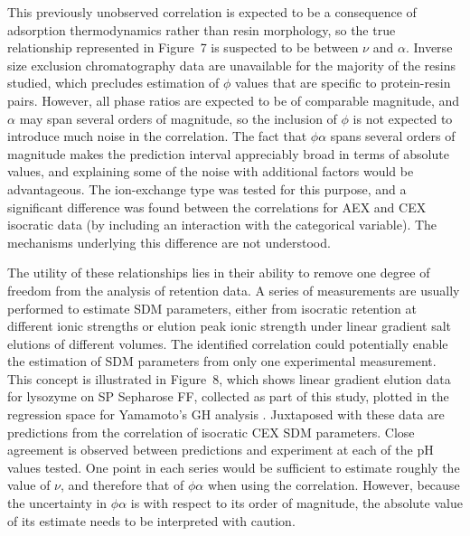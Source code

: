 \documentclass[preprint,review,12pt]{elsarticle}
\begin{document}
        This previously unobserved correlation is expected to be a consequence of adsorption thermodynamics rather than resin morphology, so the true relationship represented in Figure~7 is suspected to be between $\nu$ and $\alpha$. Inverse size exclusion chromatography data are unavailable for the majority of the resins studied, which precludes estimation of $\phi$ values that are specific to protein-resin pairs. However, all phase ratios are expected to be of comparable magnitude, and $\alpha$ may span several orders of magnitude, so the inclusion of $\phi$ is not expected to introduce much noise in the correlation. The fact that $\phi \alpha$ spans several orders of magnitude makes the prediction interval appreciably broad in terms of absolute values, and explaining some of the noise with additional factors would be advantageous. The ion-exchange type was tested for this purpose, and a significant difference was found between the correlations for AEX and CEX isocratic data (by including an interaction with the categorical variable). The mechanisms underlying this difference are not understood.


        The utility of these relationships lies in their ability to remove one degree of freedom from the analysis of retention data. A series of measurements are usually performed to estimate SDM parameters, either from isocratic retention at different ionic strengths or elution peak ionic strength under linear gradient salt elutions of different volumes. The identified correlation could potentially enable the estimation of SDM parameters from only one experimental measurement. This concept is illustrated in Figure~8, which shows linear gradient elution data for lysozyme on SP Sepharose FF, collected as part of this study, plotted in the regression space for Yamamoto's GH analysis \cite{Yamamoto1987}. Juxtaposed with these data are predictions from the correlation of isocratic CEX SDM parameters. Close agreement is observed between predictions and experiment at each of the pH values tested. One point in each series would be sufficient to estimate roughly the value of $\nu$, and therefore that of $\phi \alpha$ when using the correlation. However, because the uncertainty in $\phi \alpha$ is with respect to its order of magnitude, the absolute value of its estimate needs to be interpreted with caution.
\end{document}

